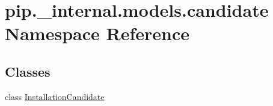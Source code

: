\hypertarget{namespacepip_1_1__internal_1_1models_1_1candidate}{}\section{pip.\+\_\+internal.\+models.\+candidate Namespace Reference}
\label{namespacepip_1_1__internal_1_1models_1_1candidate}
\subsection*{Classes}
\begin{DoxyCompactItemize}
\item 
class \hyperlink{classpip_1_1__internal_1_1models_1_1candidate_1_1InstallationCandidate}{Installation\+Candidate}
\end{DoxyCompactItemize}
